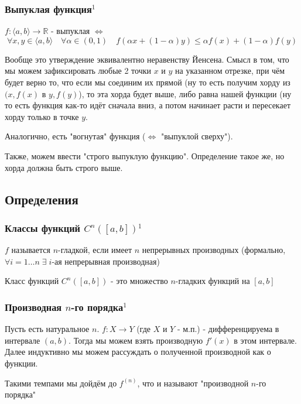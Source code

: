 \documentclass{article}
\begin{document}
\subsubsection{Выпуклая функция\texorpdfstring{$^1$}{}}
$f : \langle a, b\rangle \rightarrow \mathbb{R}$ - выпуклая $\Leftrightarrow$
$$
\forall x, y \in \langle a, b \rangle \quad \forall \alpha \in (0, 1) \quad f(\alpha x + (1-\alpha)y) \le \alpha f(x)+(1-\alpha) f(y)
$$

Вообще это утверждение эквивалентно неравенству Йенсена. Смысл в том, что мы можем зафиксировать любые 2 точки $x$ и $y$ на указанном отрезке, при чём будет верно то, что если мы соединим их прямой (ну то есть получим хорду из $(x, f(x)$ в $y, f(y)$), то эта хорда будет выше, либо равна нашей функции (ну то есть функция как-то идёт сначала вниз, а потом начинает расти и пересекает хорду только в точке $y$. 

Аналогично, есть "вогнутая" функция ($\Leftrightarrow$ "выпуклой сверху").

Также, можем ввести "строго выпуклую функцию". Определение такое же, но хорда должна быть строго выше.


\newpage
\subsection{Определения}

\subsubsection{Классы функций \texorpdfstring{$C^n([a,b])$}{n-гладкое C([a, b])}\texorpdfstring{$^1$}{}}
$f$ называется $n$-гладкой, если имеет $n$ непрерывных производных (формально, $\forall i = 1\ldots n \; \exists \; i$-ая непрерывная производная)

Класс функций $C^n([a,b])$ - это множество $n$-гладких функций на $[a,b]$


\subsubsection{Производная \texorpdfstring{$n$}{n}-го порядка\texorpdfstring{$^1$}{}}
Пусть есть натуральное $n$. $f: X \rightarrow Y$ (где $X$ и $Y$ - м.п.) - дифференцируема в интервале $(a, b)$. Тогда мы можем взять производную $f'(x)$ в этом интервале. Далее индуктивно мы можем рассуждать о полученной производной как о функции. 

Такими темпами мы дойдём до $f^(n)$, что и называют "производной $n$-го порядка"
\end{document}
